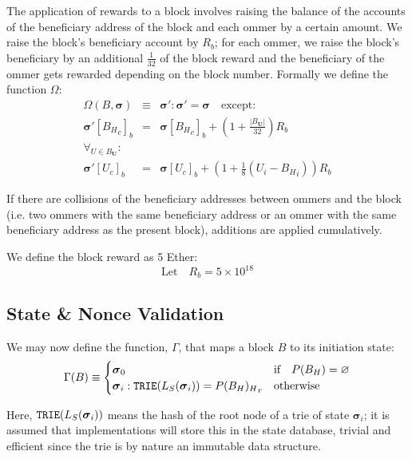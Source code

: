 \documentclass[9pt,oneside]{amsart}
\begin{document}
\begin{multicols}{2}
The application of rewards to a block involves raising the balance of the accounts of the beneficiary address of the block and each ommer by a certain amount. We raise the block's beneficiary account by $R_b$; for each ommer, we raise the block's beneficiary by an additional $\frac{1}{32}$ of the block reward and the beneficiary of the ommer gets rewarded depending on the block number. Formally we define the function $\Omega$:
\begin{eqnarray}
\Omega(B, \boldsymbol{\sigma}) & \equiv & \boldsymbol{\sigma}': \boldsymbol{\sigma}' = \boldsymbol{\sigma} \quad \text{except:} \\
\boldsymbol{\sigma}'[{B_H}_c]_b & = & \boldsymbol{\sigma}[{B_H}_c]_b + (1 + \frac{|B_\mathbf{U}|}{32})R_b \\
\forall_{U \in B_\mathbf{U}}: \\ \nonumber
 \boldsymbol{\sigma}'[U_c]_b & = & \boldsymbol{\sigma}[U_c]_b + (1 + \frac{1}{8} (U_i - {B_H}_i)) R_b 
\end{eqnarray}

If there are collisions of the beneficiary addresses between ommers and the block (i.e. two ommers with the same beneficiary address or an ommer with the same beneficiary address as the present block), additions are applied cumulatively.

We define the block reward as 5 Ether:
\begin{equation}
\text{Let} \quad R_b = 5 \times 10^{18}
\end{equation}

\subsection{State \& Nonce Validation}\label{sec:statenoncevalidation}

We may now define the function, $\Gamma$, that maps a block $B$ to its initiation state:
\begin{equation}
\Gamma(B) \equiv \begin{cases}
\boldsymbol{\sigma}_0 & \text{if} \quad P(B_H) = \varnothing \\
\boldsymbol{\sigma}_i: \mathtt{\small TRIE}(L_S(\boldsymbol{\sigma}_i)) = {P(B_H)_H}_r & \text{otherwise}
\end{cases}
\end{equation}

Here, $\mathtt{\small TRIE}(L_S(\boldsymbol{\sigma}_i))$ means the hash of the root node of a trie of state $\boldsymbol{\sigma}_i$; it is assumed that implementations will store this in the state database, trivial and efficient since the trie is by nature an immutable data structure.


\end{multicols}
\end{document}
